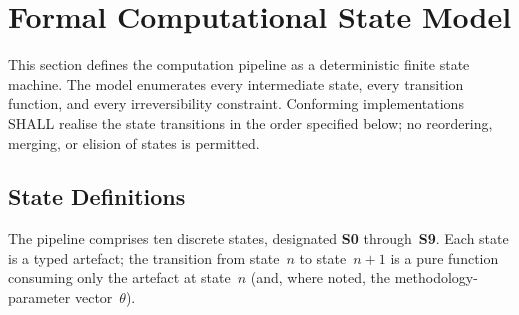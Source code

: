 \section{Formal Computational State Model}\label{sec:state-model}

This section defines the \ISI computation pipeline as a deterministic finite
state machine.  The model enumerates every intermediate state, every
transition function, and every irreversibility constraint.  Conforming
implementations SHALL realise the state transitions in the order specified
below; no reordering, merging, or elision of states is permitted.

\subsection{State Definitions}\label{sec:state:defs}

The pipeline comprises ten discrete states, designated \textbf{S0}
through~\textbf{S9}.  Each state is a typed artefact; the transition from
state~\(n\) to state~\(n+1\) is a pure function consuming only the
artefact at state~\(n\) (and, where noted, the methodology-parameter
vector~\(\theta\)).

